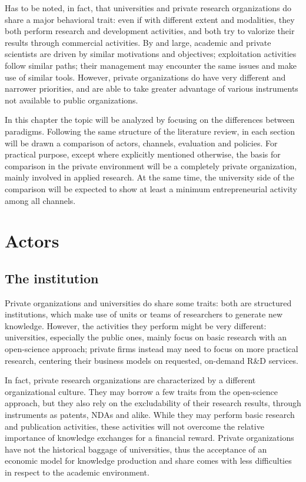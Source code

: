 Has to be noted, in fact, that universities and private research organizations do share a major behavioral trait: even if with different extent and modalities, they both perform research and development activities, and both try to valorize their results through commercial activities. By and large, academic and private scientists are driven by similar motivations and objectives; exploitation activities follow similar paths; their management may encounter the same issues and make use of similar tools. However, private organizations do have very different and narrower priorities, and are able to take greater advantage of various instruments not available to public organizations. 

In this chapter the topic will be analyzed by focusing on the differences between paradigms. Following the same structure of the literature review, in each section will be drawn a comparison of actors, channels, evaluation and policies. For practical purpose, except where explicitly mentioned otherwise, the basis for comparison in the private environment will be a completely private organization, mainly involved in applied research. At the same time, the university side of the comparison will be expected to show at least a minimum entrepreneurial activity among all channels. 

\section{Actors}

\subsection{The institution}

Private organizations and universities do share some traits: both are structured institutions, which make use of units or teams of researchers to generate new knowledge. However, the activities they perform might be very different: universities, especially the public ones, mainly focus on basic research with an open-science approach; private firms instead may need to focus on more practical research, centering their business models on requested, on-demand R\&D services.

In fact, private research organizations are characterized by a different organizational culture. They may borrow a few traits from the open-science approach, but they also rely on the excludability of their research results, through instruments as patents, NDAs and alike. While they may perform basic research and publication activities, these activities will not overcome the relative importance of knowledge exchanges for a financial reward. Private organizations have not the historical baggage of universities, thus the acceptance of an economic model for knowledge production and share comes with less difficulties in respect to the academic environment.

